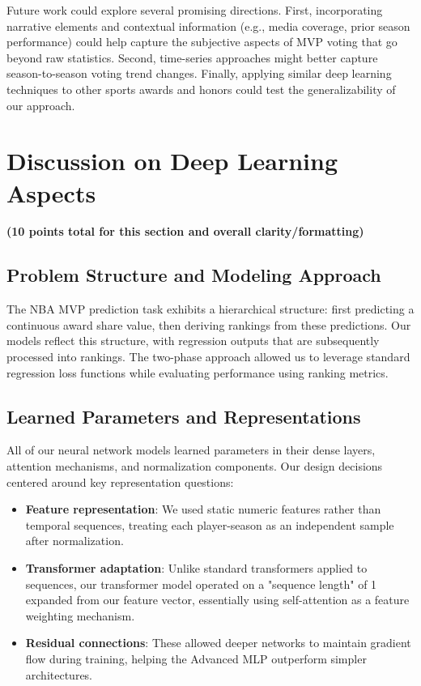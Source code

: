\documentclass[10pt,twocolumn,letterpaper]{article}
\begin{document}
Future work could explore several promising directions. First, incorporating narrative elements and contextual information (e.g., media coverage, prior season performance) could help capture the subjective aspects of MVP voting that go beyond raw statistics. Second, time-series approaches might better capture season-to-season voting trend changes. Finally, applying similar deep learning techniques to other sports awards and honors could test the generalizability of our approach.

\section{Discussion on Deep Learning Aspects}
\textbf{(10 points total for this section and overall clarity/formatting)}

\subsection{Problem Structure and Modeling Approach}

The NBA MVP prediction task exhibits a hierarchical structure: first predicting a continuous award share value, then deriving rankings from these predictions. Our models reflect this structure, with regression outputs that are subsequently processed into rankings. The two-phase approach allowed us to leverage standard regression loss functions while evaluating performance using ranking metrics.

\subsection{Learned Parameters and Representations}

All of our neural network models learned parameters in their dense layers, attention mechanisms, and normalization components. Our design decisions centered around key representation questions:

\begin{itemize}
    \item \textbf{Feature representation}: We used static numeric features rather than temporal sequences, treating each player-season as an independent sample after normalization.
    \item \textbf{Transformer adaptation}: Unlike standard transformers applied to sequences, our transformer model operated on a "sequence length" of 1 expanded from our feature vector, essentially using self-attention as a feature weighting mechanism.
    \item \textbf{Residual connections}: These allowed deeper networks to maintain gradient flow during training, helping the Advanced MLP outperform simpler architectures.
\end{itemize}
\end{document}
